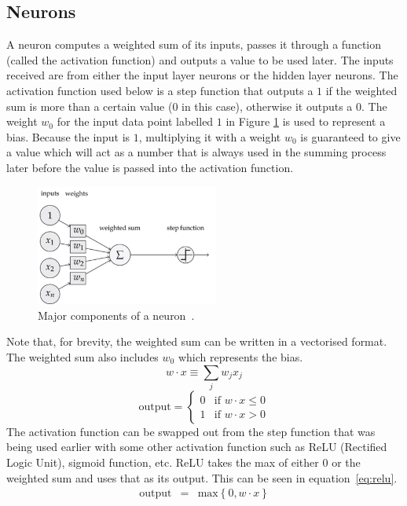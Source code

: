 \documentclass[12pt]{article}
\begin{document}
\subsection{Neurons}
A neuron computes a weighted sum of its inputs, passes it through a function (called the activation function) and outputs a value to be used later. The inputs received are from either the input layer neurons or the hidden layer neurons. The activation function used below is a step function that outputs a $1$ if the weighted sum is more than a certain value ($0$ in this case), otherwise it outputs a $0$. The weight $w_0$ for the input data point labelled $1$ in Figure \ref{fig:neuron} is used to represent a bias. Because the input is $1$, multiplying it with a weight $w_0$ is guaranteed to give a value which will act as a number that is always used in the summing process later before the value is passed into the activation function. 
\begin{figure}[H]
	\centering
	\includegraphics[width=6cm]{resources/neuron.png}
	\caption{Major components of a neuron~\cite{web:neuron}.}
	\label{fig:neuron}
\end{figure}
\noindent Note that, for brevity, the weighted sum can be written in a vectorised format. The weighted sum also includes $w_0$ which represents the bias.
$$w \cdot x \equiv \sum_j w_j x_j$$
$$  \mbox{output} = \left\{ 
    \begin{array}{ll} 
      0 & \mbox{if } w\cdot x \leq 0 \\
      1 & \mbox{if } w\cdot x > 0
    \end{array}
  \right.
$$
The activation function can be swapped out from the step function that was being used earlier with some other activation function such as ReLU (Rectified Logic Unit), sigmoid function, etc. ReLU takes the max of either 0 or the weighted sum and uses that as its output. This can be seen in equation~\ref{eq:relu}.
\begin{eqnarray}\label{eq:relu}
  \mbox{output}&=& \mbox{max}\left\{0,w\cdot x\right\}
\end{eqnarray}
\end{document}
